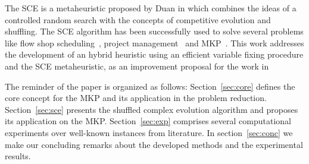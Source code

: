 The SCE is a metaheuristic proposed by Duan in \cite{duan1992effective}
which combines the ideas of a controlled random search with the concepts
of competitive evolution and shuffling.
The SCE algorithm has been successfully used to solve several problems
like flow shop scheduling~\cite{zhao2014shuffled}, project management~\cite{elbeltagi2007modified}
and MKP~\cite{baroni2015shuffled}.
This work addresses the development of an hybrid heuristic using an
efficient variable fixing procedure and the SCE metaheuristic, as an improvement
proposal for the work in \cite{baroni2015shuffled}

The reminder of the paper is organized as follows:
Section~\ref{sec:core} defines the core concept for the MKP and its application
in the problem reduction.
Section~\ref{sec:sce} presents the shuffled complex evolution algorithm
and proposes its application on the MKP.
Section~\ref{sec:exp} comprises several computational experiments over well-known
instances from literature.
In section~\ref{sec:conc} we make our concluding remarks about the developed
methods and the experimental results.

